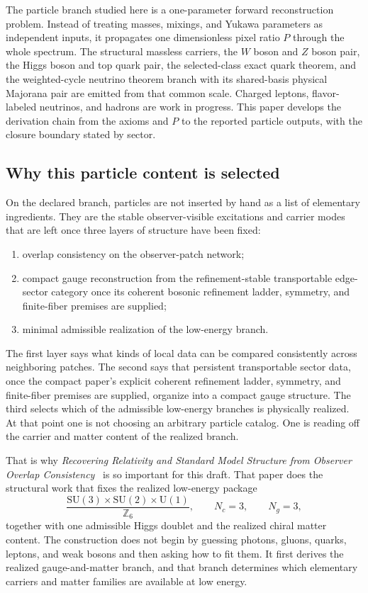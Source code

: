 \documentclass[11pt]{article}
\newcommand{\SU}{\mathrm{SU}}
\newcommand{\U}{\mathrm{U}}
\begin{document}
The particle branch studied here is a one-parameter forward reconstruction problem. Instead of
treating masses, mixings, and Yukawa parameters as independent inputs, it propagates one
dimensionless pixel ratio \(P\) through the whole spectrum. The structural massless carriers, the
\(W\) boson and \(Z\) boson pair, the Higgs boson and top quark pair, the selected-class exact quark
theorem, and the weighted-cycle neutrino theorem branch with its shared-basis physical Majorana
pair are emitted from that common scale. Charged leptons, flavor-labeled neutrinos, and hadrons are
work in progress. This paper develops the derivation chain from the axioms and \(P\) to the
reported particle outputs, with the closure boundary stated by sector.

\subsection{Why this particle content is selected}

On the declared branch, particles are not inserted by hand as a list of elementary
ingredients. They are the stable observer-visible excitations and carrier modes that
are left once three layers of structure have been fixed:
\begin{enumerate}[leftmargin=2em]
\item overlap consistency on the observer-patch network;
\item compact gauge reconstruction from the refinement-stable transportable edge-sector category once its coherent bosonic refinement ladder, symmetry, and finite-fiber premises are supplied;
\item minimal admissible realization of the low-energy branch.
\end{enumerate}
The first layer says what kinds of local data can be compared consistently across neighboring
patches. The second says that persistent transportable sector data, once the compact paper's
explicit coherent refinement ladder, symmetry, and finite-fiber premises are supplied, organize into a compact gauge
structure. The third selects which of the admissible low-energy branches is physically realized.
At that point one is not choosing an arbitrary particle catalog. One is reading off the
carrier and matter content of the realized branch.

That is why \emph{Recovering Relativity and Standard Model Structure from Observer Overlap Consistency}~\cite{ophcompact} is so important for this draft. That paper does
the structural work that fixes the realized low-energy package
\[
\frac{\SU(3)\times\SU(2)\times\U(1)}{\mathbb Z_6},
\qquad
N_c=3,
\qquad
N_g=3,
\]
together with one admissible Higgs doublet and the realized chiral matter content. The
construction does not begin by guessing photons, gluons, quarks, leptons, and weak bosons and
then asking how to fit them. It first derives the realized gauge-and-matter branch, and that
branch determines which elementary carriers and matter families are available at low energy.
\end{document}
